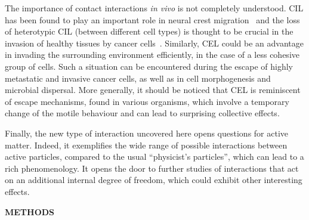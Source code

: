 \documentclass[11pt, twocolumn]{article}
\begin{document}
The importance of contact interactions \textit{in vivo} is not
completely understood. CIL has been found to play an important role in
neural crest migration~\cite{Carmona2008} and the loss of heterotypic
CIL (between different cell types) is thought to be crucial in the
invasion of healthy tissues by cancer
cells~\cite{Friedl2003,Abercrombie1979}. Similarly, CEL could be an
advantage in invading the surrounding environment efficiently, in the
case of a less cohesive group of cells. Such a situation can be
encountered during the escape of highly metastatic and invasive cancer
cells, as well as in cell morphogenesis and microbial dispersal.  More
generally, it should be noticed that CEL is reminiscent of escape
mechanisms, found in various organisms, which involve a temporary
change of the motile behaviour and can lead to surprising collective
effects\cite{Ramdya2015}. 

Finally, the new type of interaction uncovered here opens questions
for active matter. Indeed, it exemplifies the wide range of possible
interactions between active particles, compared to the usual
``physicist's particles'', which can lead to a rich phenomenology. It
opens the door to further studies of interactions that act on an
additional internal degree of freedom, which could exhibit other
interesting effects.


{\textbf{METHODS}} 
\end{document}
